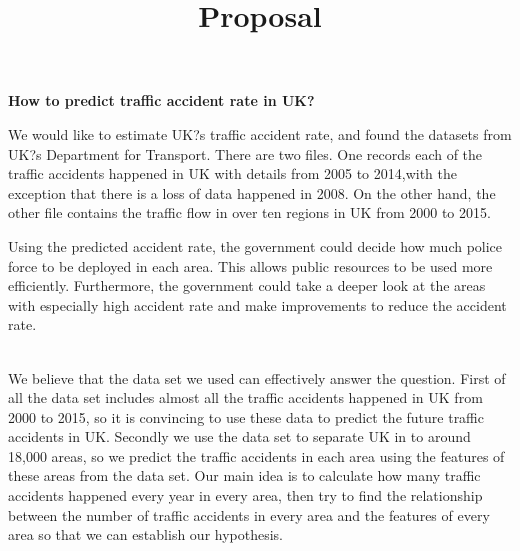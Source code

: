 \documentclass{article}
\title {\textbf{Proposal}}
\begin{document}
\date{}\maketitle

{\textbf{\fontsize{15}{30}\selectfont How to predict traffic accident rate in UK?}

}

\n
{\fontsize{14}{16}\selectfont 
{We would like to estimate UK?s traffic accident rate, and found the datasets from UK?s Department for Transport. There are two files. One records each of the traffic accidents happened in UK with details from 2005 to 2014,with the exception that there is a loss of data happened in 2008. On the other hand, the other file contains the traffic flow in over ten regions in UK from 2000 to 2015. 


Using the predicted accident rate, the government could decide how much police force to be deployed in each area. This allows public resources to be used more efficiently. Furthermore, the government could take a deeper look at the areas with especially high accident rate and make improvements to reduce the accident rate. }

{\fontsize{14}{16}\selectfont 
\\
We believe that the data set we used can effectively answer the question. First of all the data set includes almost all the traffic accidents happened in UK from 2000 to 2015, so it is convincing to use these data to predict the future traffic accidents in UK. Secondly we use the data set to separate UK in to around 18,000 areas, so we predict the traffic accidents in each area using the features of these areas from the data set. Our main idea is to calculate how many traffic accidents happened every year in every area, then try to find the relationship between the number of traffic accidents in every area and the features of every area so that we can establish our hypothesis.
}}
\end{document}
